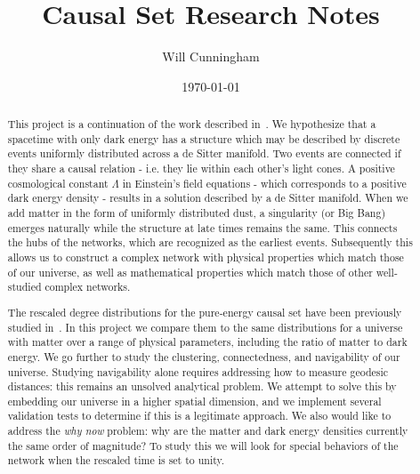 \documentclass[preprint,notitlepage,amsmath,amssymb,floatfix]{revtex4-1}
\begin{document}
\title{Causal Set Research Notes}

\author{Will Cunningham}

\noaffiliation

\date{\today}


\maketitle

\tableofcontents

\newpage

\begin{abstract}
This project is a continuation of the work described in~\cite{ref:nc2012}.  
We hypothesize that a spacetime with only dark energy has a structure which may be described by discrete events uniformly distributed across a de Sitter manifold.  
Two events are connected if they share a causal relation - i.e. they lie within each other's light cones.  
A positive cosmological constant $\Lambda$ in Einstein's field equations - which corresponds to a positive dark energy density - results in a solution described by a de Sitter manifold.
When we add matter in the form of uniformly distributed dust, a singularity (or Big Bang) emerges naturally while the structure at late times remains the same.  
This connects the hubs of the networks, which are recognized as the earliest events.
Subsequently this allows us to construct a complex network with physical properties which match those of our universe, as well as mathematical properties which match those of other well-studied complex networks. \par
The rescaled degree distributions for the pure-energy causal set have been previously studied in~\cite{ref:nc2012}.
In this project we compare them to the same distributions for a universe with matter over a range of physical parameters, including the ratio of matter to dark energy.
We go further to study the clustering, connectedness, and navigability of our universe.
Studying navigability alone requires addressing how to measure geodesic distances:  this remains an unsolved analytical problem.
We attempt to solve this by embedding our universe in a higher spatial dimension, and we implement several validation tests to determine if this is a legitimate approach.
We also would like to address the \textit{why now} problem:  why are the matter and dark energy densities currently the same order of magnitude?
To study this we will look for special behaviors of the network when the rescaled time is set to unity.
\end{abstract}
\end{document}
